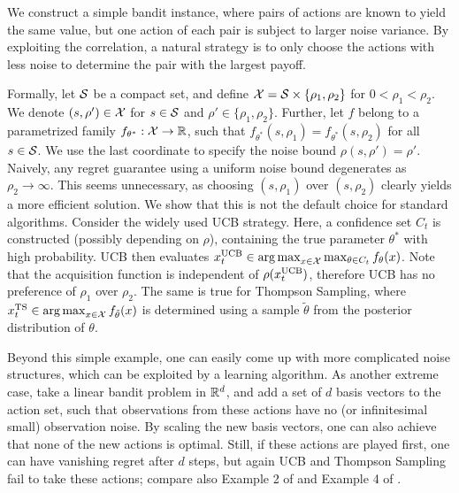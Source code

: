 \begin{example}\label{exa: ucb and ts fail} We construct a simple bandit instance, where pairs of actions are known to yield the same value, but one action of each pair is subject to larger noise variance. By exploiting the correlation, a natural strategy is to only choose the actions with less noise to determine the pair with the largest payoff.
		
Formally, let $\mathcal{S} $ be a compact set, and define $\mathcal{X} = \mathcal{S} \times \{\rho_1, \rho_2\} $ for $0 < \rho_1 < \rho_2$. We denote $(s,\rho') \in \mathcal{X}$ for $s \in \mathcal{S}$ and $\rho' \in \{\rho_1, \rho_2 \}$. Further, let  $f$ belong to a parametrized family $f_{\theta^*} : \mathcal{X} \rightarrow \mathbb{R}$, such that $f_{\theta^*}(s,\rho_1) = f_{\theta^*}(s, \rho_2)$ for all $s \in \mathcal{S}$. We use the last coordinate to specify the noise bound $\rho(s,\rho') = \rho'$.
	Naively, any regret guarantee using a uniform noise bound degenerates as $\rho_2 \rightarrow \infty$. This seems unnecessary, as choosing $(s,\rho_1)$ over $(s, \rho_2)$ clearly yields a more efficient solution. We show that this is not the default choice for standard algorithms. Consider the widely used UCB strategy. Here, a confidence set $C_t$ is constructed (possibly depending on $\rho$), containing the true parameter $\theta^*$ with high probability. UCB then evaluates $x_t^{\text{UCB}} \in \operatorname*{arg\,max}_{x \in \mathcal{X}} \max_{\theta \in C_t} f_\theta(x)$. Note that the acquisition function is independent of $\rho(x_t^{\text{UCB}})$, therefore UCB has no preference of $\rho_1$ over $\rho_2$. The same is true for Thompson Sampling, where $x_t^{\text{TS}} \in \operatorname*{arg\,max}_{x \in \mathcal{X}} f_{\tilde{\theta}}(x)$ is determined using a sample $\tilde{\theta}$ from the posterior distribution of $\theta$.
\end{example}
Beyond this simple example, one can easily come up with more complicated noise structures, which can be exploited by a learning algorithm. As another extreme case, take a linear bandit problem in $\mathbb{R}^d$, and add a set of $d$ basis vectors to the action set, such that observations from these actions have no (or infinitesimal small) observation noise. By scaling the new basis vectors, one can also achieve that none of the new actions is optimal. Still, if these actions are played first, one can have vanishing regret after $d$ steps, but again UCB and Thompson Sampling fail to take these actions; compare also Example 2 of \cite{RussoLearningOptimizeInformationDirected2014} and Example 4 of \cite{LattimoreEndOptimismAsymptotic2017}. 


